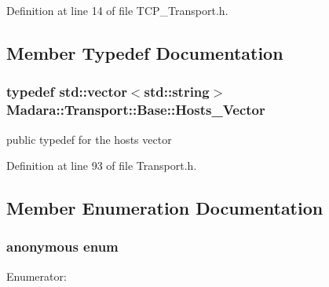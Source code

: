 Definition at line 14 of file TCP\_\-Transport.h.



\subsection{Member Typedef Documentation}
\hypertarget{classMadara_1_1Transport_1_1Base_a2957ae0c413e07b7e276ae69ef1c320a}{
\subsubsection[{Hosts\_\-Vector}]{\setlength{\rightskip}{0pt plus 5cm}typedef std::vector$<$std::string$>$ {\bf Madara::Transport::Base::Hosts\_\-Vector}}}
\label{dc/d97/classMadara_1_1Transport_1_1Base_a2957ae0c413e07b7e276ae69ef1c320a}


public typedef for the hosts vector 



Definition at line 93 of file Transport.h.



\subsection{Member Enumeration Documentation}
\hypertarget{classMadara_1_1Transport_1_1TCP__Transport_a3a52ca4cbe3c568232ce3ce8a835974c}{
\subsubsection[{"@7}]{\setlength{\rightskip}{0pt plus 5cm}anonymous enum}}
\label{d6/df1/classMadara_1_1Transport_1_1TCP__Transport_a3a52ca4cbe3c568232ce3ce8a835974c}
\begin{Desc}
\item[Enumerator: ]\par
\begin{description}
\item[{\em 
\hypertarget{classMadara_1_1Transport_1_1TCP__Transport_a3a52ca4cbe3c568232ce3ce8a835974ca2d61332f904295fa39f255246d4dcdbc}{
RELIABLE}
\label{d6/df1/classMadara_1_1Transport_1_1TCP__Transport_a3a52ca4cbe3c568232ce3ce8a835974ca2d61332f904295fa39f255246d4dcdbc}
}]\end{description}
\end{Desc}



